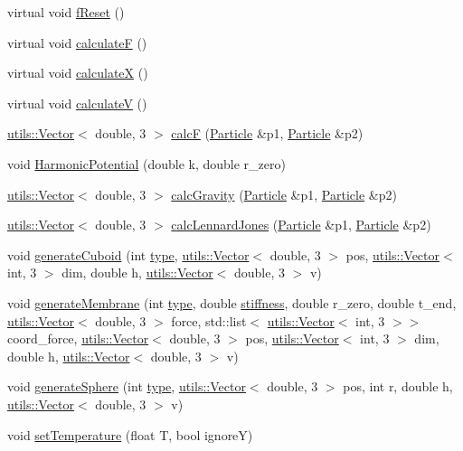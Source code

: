 \begin{DoxyCompactItemize}
virtual void \hyperlink{classParticleContainer_af5626526d41510605c20161df34de71b}{f\+Reset} ()
\item 
virtual void \hyperlink{classParticleContainer_a329f1c21166cb9722553a1845f9be4d0}{calculateF} ()
\item 
virtual void \hyperlink{classParticleContainer_abfe567934c1e3319a03377ebf7da2369}{calculateX} ()
\item 
virtual void \hyperlink{classParticleContainer_a7b436c3226f9eb05e86d895a7eab8b41}{calculateV} ()
\item 
\hyperlink{classutils_1_1Vector}{utils\+::\+Vector}$<$ double, 3 $>$ \hyperlink{classParticleContainer_a902a63a3c7758262aaec851a61557424}{calcF} (\hyperlink{classParticle}{Particle} \&p1, \hyperlink{classParticle}{Particle} \&p2)
\item 
void \hyperlink{classParticleContainer_a76b73383fadd0c6605bc44910357b5cd}{Harmonic\+Potential} (double k, double r\+\_\+zero)
\item 
\hyperlink{classutils_1_1Vector}{utils\+::\+Vector}$<$ double, 3 $>$ \hyperlink{classParticleContainer_a672e44d2fe6c69fd9f1e15b5aa3897f1}{calc\+Gravity} (\hyperlink{classParticle}{Particle} \&p1, \hyperlink{classParticle}{Particle} \&p2)
\item 
\hyperlink{classutils_1_1Vector}{utils\+::\+Vector}$<$ double, 3 $>$ \hyperlink{classParticleContainer_a8c64e42668cc829b2bc7bd7f12692c8c}{calc\+Lennard\+Jones} (\hyperlink{classParticle}{Particle} \&p1, \hyperlink{classParticle}{Particle} \&p2)
\item 
void \hyperlink{classParticleContainer_a5bd493f8fcdb9d4cf1f21c9a1108548f}{generate\+Cuboid} (int \hyperlink{classtype}{type}, \hyperlink{classutils_1_1Vector}{utils\+::\+Vector}$<$ double, 3 $>$ pos, \hyperlink{classutils_1_1Vector}{utils\+::\+Vector}$<$ int, 3 $>$ dim, double h, \hyperlink{classutils_1_1Vector}{utils\+::\+Vector}$<$ double, 3 $>$ v)
\item 
void \hyperlink{classParticleContainer_a1cddd777f83656d0593775612cf56af8}{generate\+Membrane} (int \hyperlink{classtype}{type}, double \hyperlink{classParticleContainer_a3a00b0487e24b68b5cedc29087221f00}{stiffness}, double r\+\_\+zero, double t\+\_\+end, \hyperlink{classutils_1_1Vector}{utils\+::\+Vector}$<$ double, 3 $>$ force, std\+::list$<$ \hyperlink{classutils_1_1Vector}{utils\+::\+Vector}$<$ int, 3 $>$$>$ coord\+\_\+force, \hyperlink{classutils_1_1Vector}{utils\+::\+Vector}$<$ double, 3 $>$ pos, \hyperlink{classutils_1_1Vector}{utils\+::\+Vector}$<$ int, 3 $>$ dim, double h, \hyperlink{classutils_1_1Vector}{utils\+::\+Vector}$<$ double, 3 $>$ v)
\item 
void \hyperlink{classParticleContainer_aa51fcd453b6fac96026ce942fe674454}{generate\+Sphere} (int \hyperlink{classtype}{type}, \hyperlink{classutils_1_1Vector}{utils\+::\+Vector}$<$ double, 3 $>$ pos, int r, double h, \hyperlink{classutils_1_1Vector}{utils\+::\+Vector}$<$ double, 3 $>$ v)
\item 
void \hyperlink{classParticleContainer_a7861f4a36ac905683eb741e4afe2e4b1}{set\+Temperature} (float T, bool ignoreY)
\end{DoxyCompactItemize}
